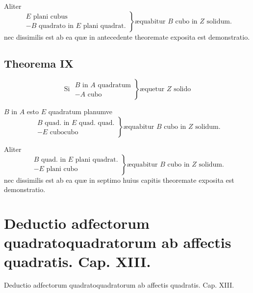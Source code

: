 \documentclass[11pt,a4paper]{article}
\begin{document}
Aliter
\[ \left.\begin{array}{l} E \text{ plani cubus} \\ - B \text{ quadrato in } E \text{ plani quadrat.} \end{array}\right\} \text{æquabitur } B \text{ cubo in } Z \text{ solidum.} \]
nec dissimilis est ab ea quæ in antecedente theoremate exposita est demonstratio.

\subsection*{Theorema IX}

\[ \text{Si } \left.\begin{array}{l} B \text{ in } A \text{ quadratum} \\ - A \text{ cubo} \end{array}\right\} \text{æquetur } Z \text{ solido} \]

$B$ in $A$ esto $E$ quadratum planumve
\[ \left.\begin{array}{l} B \text{ quad. in } E \text{ quad. quad.} \\ - E \text{ cubocubo} \end{array}\right\} \text{æquabitur } B \text{ cubo in } Z \text{ solidum.} \]

Aliter
\[ \left.\begin{array}{l} B \text{ quad. in } E \text{ plani quadrat.} \\ - E \text{ plani cubo} \end{array}\right\} \text{æquabitur } B \text{ cubo in } Z \text{ solidum.} \]
nec dissimilis est ab ea quæ in septimo huius capitis theoremate exposita est demonstratio.


\section*{Deductio adfectorum quadratoquadratorum ab affectis quadratis. Cap. XIII.}

Deductio adfectorum quadratoquadratorum ab affectis quadratis. Cap. XIII.
\end{document}
